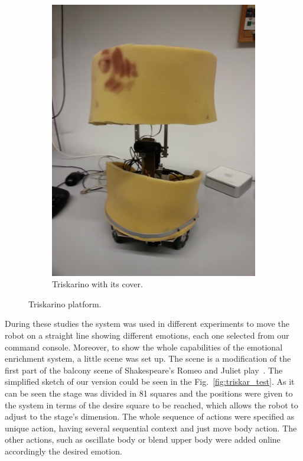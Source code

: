 \begin{figure}
\begin{subfigure}[c]{0.2\textwidth}
	\includegraphics[width=\textwidth]{./Images/platform_fome.jpg}
	\caption{Triskarino with its cover.}
	\label{fig:triskar}
	\end{subfigure}
	\caption{Triskarino platform.}
	\label{fig:robot}
\end{figure}  
 During these studies the system was used in different experiments to move the robot on a straight line showing different emotions, each one selected from our command console. Moreover, to show the whole capabilities of the emotional enrichment system, a little scene was set up. The scene is a modification of the first part of the balcony scene of Shakespeare's Romeo and Juliet play~\cite{RAndJ}. The simplified sketch of our version could be seen in the Fig.~\ref{fig:triskar_test}. As it can be seen the stage was divided in 81 squares and the positions were given to the system in terms of the desire square to be reached, which allows the robot to adjust to the stage's dimension. %
The whole sequence of actions were specified as unique action, having several sequential context and just move body action. The other actions, such as oscillate body or blend upper body were added online accordingly the desired emotion.  

